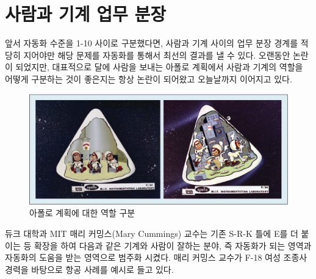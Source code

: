 \documentclass[smallextended]{svjour3}       %
\begin{document}
\hypertarget{man-human-boundary}{%
\section{사람과 기계 업무 분장}\label{man-human-boundary}}

앞서 자동화 수준을 1-10 사이로 구분했다면, 사람과 기계 사이의 업무 분장
경계를 적당히 지어야만 해당 문제를 자동화를 통해서 최선의 결과를 낼 수
있다. 오랜동안 논란이 되었지만, 대표적으로 달에 사람을 보내는 아폴로
계획에서 사람과 기계의 역할을 어떻게 구분하는 것이 좋은지는 항상 논란이
되어왔고 오늘날까지 이어지고 있다.

\begin{figure}

{\centering \includegraphics[width=0.77\linewidth]{fig/man-machine-role-allocation} 

}

\caption{아폴로 계획에 대한 역할 구분}\label{fig:unnamed-chunk-6}
\end{figure}

듀크 대학과 MIT 매리 커밍스(Mary Cummings) 교수는 기존 S-R-K 틀에 E를 더
붙이는 등 확장을 하여 다음과 같은 기계와 사람이 잘하는 분야, 즉 자동화가
되는 영역과 자동화의 도움을 받는 영역으로 범주화 시켰다. 매리 커밍스
교수가 F-18 여성 조종사 경력을 바탕으로 항공 사례를 예시로 들고 있다.

\begin{table}[H]
\centering
{}
\end{table}
\end{document}
